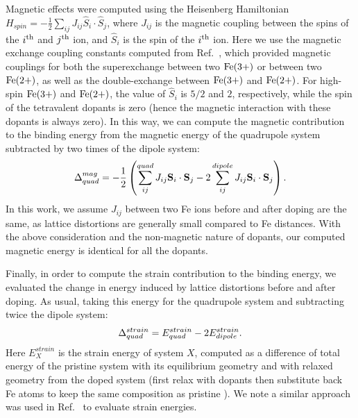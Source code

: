Magnetic effects were computed using the Heisenberg Hamiltonian $H_{spin}=-\frac{1}{2}\sum_{ij}J_{ij}\hat{S}_i\cdot\hat{S}_j$, where $J_{ij}$ is the magnetic coupling between the spins of the $i^{\rm th}$ and $j^{\rm th}$ ion, and $\hat{S}_i$ is the spin of the $i^{\rm th}$ ion. Here we use the magnetic exchange coupling constants computed from Ref.~\cite{nabi2010magnetic}, which provided magnetic couplings for both the superexchange between two $\rm Fe (3+)$ or between two $\rm Fe (2+)$, as well as the double-exchange between $\rm Fe (3+)$ and $\rm Fe (2+)$. For high-spin $\rm Fe (3+)$ and $\rm Fe (2+)$, the value of $\hat{S}_i$ is $5/2$ and $2$, respectively, while the spin of the tetravalent dopants is zero (hence the magnetic interaction with these dopants is always zero). In this way, we can compute the magnetic contribution to the binding energy from the magnetic energy of the quadrupole system subtracted by two times of the dipole system:
\begin{align}
    \Delta_{quad}^{mag} = -\frac{1}{2}\left( \sum_{ij}^{quad} J_{ij} \textbf{S}_i \cdot \textbf{S}_j - 2\sum_{ij}^{dipole} J_{ij} \textbf{S}_i \cdot \textbf{S}_j\right).
    \label{eq:be_mag}
\end{align}
In this work, we assume $J_{ij}$ between two Fe ions before and after doping are the same, as lattice distortions are generally small compared to Fe distances.
With the above consideration and the non-magnetic nature of dopants, our computed magnetic energy is identical for all the dopants.

Finally, in order to compute the strain contribution to the binding energy, we evaluated the change in energy induced by lattice distortions before and after doping. As usual, taking this energy for the quadrupole system and subtracting twice the dipole system:
\begin{align}
    \Delta_{quad}^{strain} = E_{quad}^{strain} - 2 E_{dipole}^{strain}.
    \label{eq:be_strain}
\end{align}
Here $E_{X}^{strain}$ is the strain energy of system $X$, computed as a difference of total energy of the pristine system with its equilibrium geometry and with relaxed geometry from the doped system (first relax with dopants then substitute back Fe atoms to keep the same composition as pristine ). We note a similar approach was used in Ref.~\cite{bao2017first} to evaluate strain energies.

